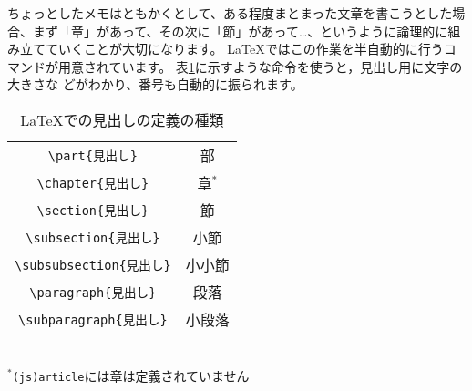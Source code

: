ちょっとしたメモはともかくとして、ある程度まとまった文章を書こうとした場
合、まず「章」があって、その次に「節」があって…、というように論理的に組
み立てていくことが大切になります。
{\LaTeX}ではこの作業を半自動的に行うコマンドが用意されています。
表\ref{tab:headline}に示すような命令を使うと，見出し用に文字の大きさな
どがわかり、番号も自動的に振られます。
\begin{table}[htbp]
\begin{center}
\caption{{\LaTeX}での見出しの定義の種類}
\label{tab:headline}
\begin{tabular}{c|c}\hline
 \verb+\part{見出し}+         & 部 \\
 \verb+\chapter{見出し}+       & 章${}^{*}$ \\
 \verb+\section{見出し}+       & 節 \\
 \verb+\subsection{見出し}+    & 小節 \\
 \verb+\subsubsection{見出し}+ & 小小節 \\
 \verb+\paragraph{見出し}+     & 段落 \\
 \verb+\subparagraph{見出し}+  & 小段落 \\
 \hline
\end{tabular}\\
{\small ${}^{*}$\verb+(js)article+には章は定義されていません}
\end{center}
\end{table}

